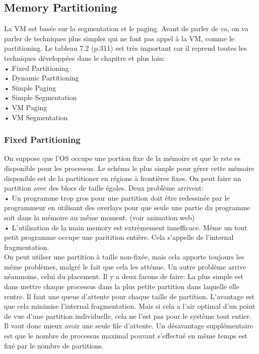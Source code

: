 \subsection{Memory Partitioning}
La VM est basée sur la segmentation et le paging. Avant de parler de ca, on va parler de techniques plus simples qui ne font pas appel à la VM, comme le partitioning. Le tableau 7.2 (p.311) est très important car il reprend toutes les techniques développées dans le chapitre et plus loin: \\
• Fixed Partitioning \\
• Dynamic Partitioning \\
• Simple Paging \\
• Simple Segmentation \\
• VM Paging \\
• VM Segmentation \\
\subsubsection{Fixed Partitioning}
On suppose que l’OS occupe une portion fixe de la mémoire et que le rste es disponible pour les processus. Le schéma le plus simple pour gérer cette mémoire disponible est de la partitioner en régions à frontières fixes.
On peut faire un partition avec des blocs de taille égales. Deux problème arrivent: \\
• Un programme trop gros pour une partition doit être redessinée par le programmeur en utilisant des overlays pour que seule une partie du programme soit dans la mémoire au même moment. (voir animation web) \\
• L’utilisation de la main memory est extrèmement innefficace. Même un tout petit programme occupe une paritition entière. Cela s’appelle de l’internal fragmentation. \\
On peut utilser une partition à taille non-fixée, mais cela apporte toujours les même problèmes, malgré le fait que cela les atténue. Un autre problème arrive néanmoins, celui du placement. Il y a deux facons de faire: La plus simple est dans mettre chaque processus dans la plus petite partition dans laquelle elle rentre. Il faut une queue d’attente pour chaque taille de partition. L’avantage est que cela minimise l’internal fragmentation. Mais si cela a l’air optimal d’un point de vue d’une partition individuelle, cela ne l’est pas pour le système tout entier. Il vaut donc mieux avoir une seule file d’attente. Un désavantage supplémentaire est que le nombre de processus maximal pouvant s’effectué en même temps est fixé par le nombre de partitions.
